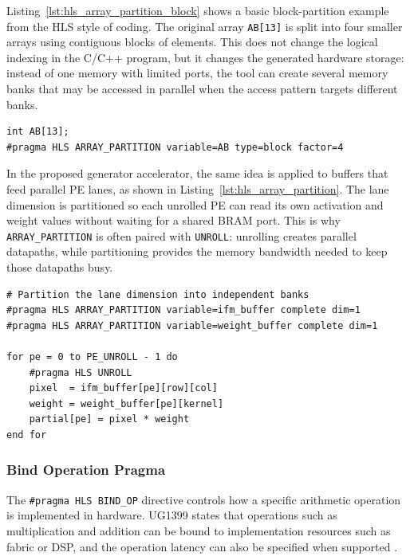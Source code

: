 Listing~\ref{lst:hls_array_partition_block} shows a basic block-partition example from the HLS style of coding. The original array \texttt{AB[13]} is split into four smaller arrays using contiguous blocks of elements. This does not change the logical indexing in the C/C++ program, but it changes the generated hardware storage: instead of one memory with limited ports, the tool can create several memory banks that may be accessed in parallel when the access pattern targets different banks.

\begin{lstlisting}[caption={Pseudo-code for block partitioning a 13-element array},label={lst:hls_array_partition_block}]
int AB[13];
#pragma HLS ARRAY_PARTITION variable=AB type=block factor=4
\end{lstlisting}

In the proposed generator accelerator, the same idea is applied to buffers that feed parallel PE lanes, as shown in Listing~\ref{lst:hls_array_partition}. The lane dimension is partitioned so each unrolled PE can read its own activation and weight values without waiting for a shared BRAM port. This is why \texttt{ARRAY\_PARTITION} is often paired with \texttt{UNROLL}: unrolling creates parallel datapaths, while partitioning provides the memory bandwidth needed to keep those datapaths busy.

\begin{lstlisting}[caption={Pseudo-code for array partitioning to feed parallel PE lanes},label={lst:hls_array_partition}]
# Partition the lane dimension into independent banks
#pragma HLS ARRAY_PARTITION variable=ifm_buffer complete dim=1
#pragma HLS ARRAY_PARTITION variable=weight_buffer complete dim=1

for pe = 0 to PE_UNROLL - 1 do
    #pragma HLS UNROLL
    pixel  = ifm_buffer[pe][row][col]
    weight = weight_buffer[pe][kernel]
    partial[pe] = pixel * weight
end for
\end{lstlisting}

\subsubsection{Bind Operation Pragma}

The \texttt{\#pragma HLS BIND\_OP} directive controls how a specific arithmetic operation is implemented in hardware. UG1399 states that operations such as multiplication and addition can be bound to implementation resources such as fabric or DSP, and the operation latency can also be specified when supported \cite{amd2026vitisHls}.

